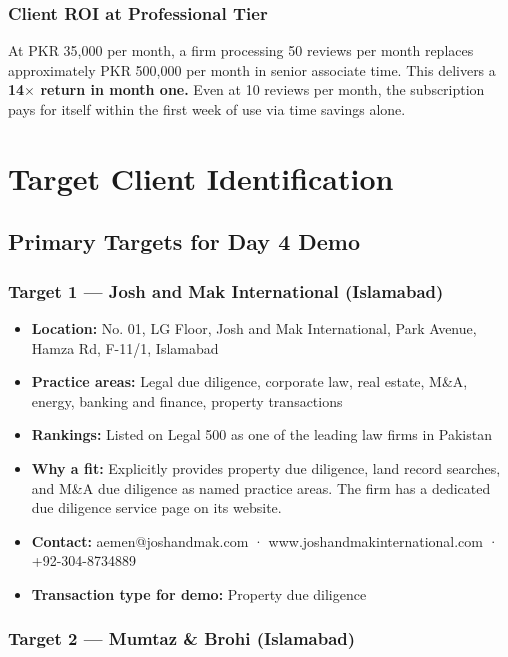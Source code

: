 \documentclass[12pt, a4paper]{article}
\begin{document}
\subsubsection{Client ROI at Professional Tier}

At PKR 35,000 per month, a firm processing 50 reviews per month replaces
approximately PKR 500,000 per month in senior associate time. This delivers a
\textbf{14$\times$ return in month one.} Even at 10 reviews per month, the
subscription pays for itself within the first week of use via time savings alone.

\section{Target Client Identification}

\subsection{Primary Targets for Day 4 Demo}

\subsubsection{Target 1 — Josh and Mak International (Islamabad)}

\begin{itemize}[leftmargin=1.5cm]
    \item \textbf{Location:} No. 01, LG Floor, Josh and Mak International, Park Avenue, Hamza Rd, F-11/1, Islamabad
    \item \textbf{Practice areas:} Legal due diligence, corporate law,
    real estate, M\&A, energy, banking and finance, property transactions
    \item \textbf{Rankings:} Listed on Legal 500 as one of the leading
    law firms in Pakistan
    \item \textbf{Why a fit:} Explicitly provides property due diligence,
    land record searches, and M\&A due diligence as named practice areas.
    The firm has a dedicated due diligence service page on its website.
    \item \textbf{Contact:} aemen@joshandmak.com · www.joshandmakinternational.com
    · +92-304-8734889
    \item \textbf{Transaction type for demo:} Property due diligence
\end{itemize}

\subsubsection{Target 2 — Mumtaz \& Brohi (Islamabad)}
\end{document}
